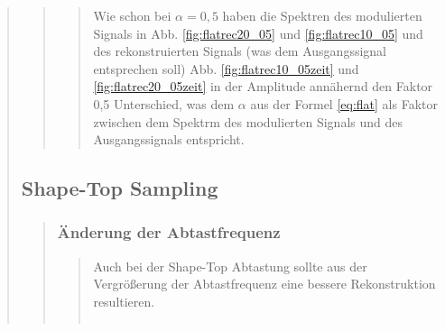 \begin{quote}
\begin{quote}
\begin{quote}
            Wie schon bei $\alpha=0,5$ haben die Spektren des modulierten Signals in Abb. \ref{fig:flatrec20_05} und
            \ref{fig:flatrec10_05} und des rekonstruierten Signals (was dem Ausgangssignal entsprechen soll) Abb. \ref{fig:flatrec10_05zeit} und
            \ref{fig:flatrec20_05zeit} in der Amplitude annähernd den Faktor 0,5 Unterschied, was dem $\alpha$
            aus der Formel \ref{eq:flat} als Faktor zwischen dem Spektrm des modulierten Signals und des
            Ausgangssignals entspricht.
                        
             
        \end{quote}
    
    \end{quote}
    
    \subsection{Shape-Top Sampling}
    \begin{quote}
        
        
        \subsubsection{Änderung der Abtastfrequenz}
        \begin{quote}
            
            Auch bei der Shape-Top Abtastung sollte aus der Vergrößerung der Abtastfrequenz eine bessere
            Rekonstruktion resultieren.
            
            \begin{center}
            \begin{tabular}{ll}
            

\end{tabular}
\end{center}
\end{quote}
\end{quote}
\end{quote}
